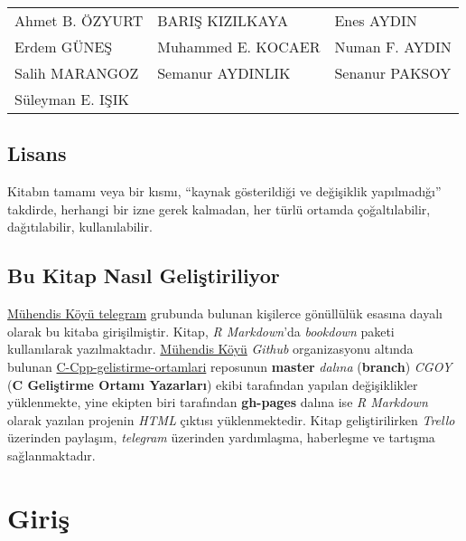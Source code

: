 \documentclass[
]{book}
\begin{document}
\begin{tabular}{l|l|l}
\hline
 &  & \\
\hline
Ahmet B. ÖZYURT & BARIŞ KIZILKAYA & Enes AYDIN\\
\hline
Erdem GÜNEŞ & Muhammed E. KOCAER & Numan F. AYDIN\\
\hline
Salih MARANGOZ & Semanur AYDINLIK & Senanur PAKSOY\\
\hline
Süleyman E. IŞIK &  & \\
\hline
\end{tabular}

\hypertarget{lisans}{%
\section*{Lisans}\label{lisans}}

Kitabın tamamı veya bir kısmı, ``kaynak gösterildiği ve değişiklik yapılmadığı'' takdirde, herhangi bir izne gerek kalmadan, her türlü ortamda çoğaltılabilir, dağıtılabilir, kullanılabilir.

\hypertarget{bu-kitap-nasux131l-geliux15ftiriliyor}{%
\section*{Bu Kitap Nasıl Geliştiriliyor}\label{bu-kitap-nasux131l-geliux15ftiriliyor}}

\href{https://t.me/koyumuhendis}{Mühendis Köyü telegram} grubunda bulunan kişilerce gönüllülük esasına dayalı olarak bu kitaba girişilmiştir. Kitap, \emph{R Markdown}'da \emph{bookdown} paketi kullanılarak yazılmaktadır. \href{https://github.com/MuhendisKoyu}{Mühendis Köyü} \emph{Github} organizasyonu altında bulunan \href{https://github.com/MuhendisKoyu/C-Cpp-gelistirme-ortamlari}{C-Cpp-gelistirme-ortamlari} reposunun \textbf{master} \emph{dalına} (\textbf{branch}) \emph{CGOY} (\textbf{C Geliştirme Ortamı Yazarları}) ekibi tarafından yapılan değişiklikler yüklenmekte, yine ekipten biri tarafından \textbf{gh-pages} dalına ise \emph{R Markdown} olarak yazılan projenin \emph{HTML} çıktısı yüklenmektedir. Kitap geliştirilirken \emph{Trello} üzerinden paylaşım, \emph{telegram} üzerinden yardımlaşma, haberleşme ve tartışma sağlanmaktadır.

\hypertarget{giriux15f}{%
\chapter*{Giriş}\label{giriux15f}}
\end{document}
